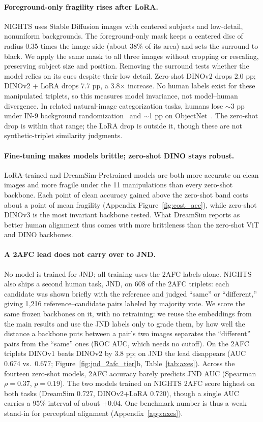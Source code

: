 \documentclass{article}
\begin{document}
\paragraph{Foreground-only fragility rises after LoRA.} NIGHTS uses Stable Diffusion images with centered subjects and low-detail, nonuniform backgrounds. The foreground-only mask keeps a centered disc of radius 0.35 times the image side (about 38\% of its area) and sets the surround to black. We apply the same mask to all three images without cropping or rescaling, preserving subject size and position. Removing the surround tests whether the model relies on its cues despite their low detail. Zero-shot DINOv2 drops 2.0 pp; DINOv2 + LoRA drops 7.7 pp, a 3.8$\times$ increase. No human labels exist for these manipulated triplets, so this measures model invariance, not model--human divergence. In related natural-image categorization tasks, humans lose $\sim$3 pp under IN-9 background randomization~\citep{xiao2020backgrounds} and $\sim$1 pp on ObjectNet~\citep{barbu2019objectnet}. The zero-shot drop is within that range; the LoRA drop is outside it, though these are not synthetic-triplet similarity judgments.

\paragraph{Fine-tuning makes models brittle; zero-shot DINO stays robust.} LoRA-trained and DreamSim-Pretrained models are both more accurate on clean images and more fragile under the 11 manipulations than every zero-shot backbone. Each point of clean accuracy gained above the zero-shot band costs about a point of mean fragility (Appendix Figure~\ref{fig:cost_acc}), while zero-shot DINOv3 is the most invariant backbone tested. What DreamSim reports as better human alignment thus comes with more brittleness than the zero-shot ViT and DINO backbones. 

\paragraph{A 2AFC lead does not carry over to JND.} No model is trained for JND; all training uses the 2AFC labels alone. NIGHTS also ships a second human task, JND, on 608 of the 2AFC triplets: each candidate was shown briefly with the reference and judged ``same'' or ``different,'' giving 1{,}216 reference--candidate pairs labeled by majority vote. We score the same frozen backbones on it, with no retraining: we reuse the embeddings from the main results and use the JND labels only to grade them, by how well the distance a backbone puts between a pair's two images separates the ``different'' pairs from the ``same'' ones (ROC AUC, which needs no cutoff). On the 2AFC triplets DINOv1 beats DINOv2 by 3.8 pp; on JND the lead disappears (AUC 0.674 vs.\ 0.677; Figure~\ref{fig:jnd_2afc_tier}b, Table~\ref{tab:axes}). Across the fourteen zero-shot models, 2AFC accuracy barely predicts JND AUC (Spearman $\rho = 0.37$, $p = 0.19$). The two models trained on NIGHTS 2AFC score highest on both tasks (DreamSim 0.727, DINOv2+LoRA 0.720), though a single AUC carries a 95\% interval of about $\pm 0.04$. One benchmark number is thus a weak stand-in for perceptual alignment (Appendix~\ref{app:axes}).
\end{document}
